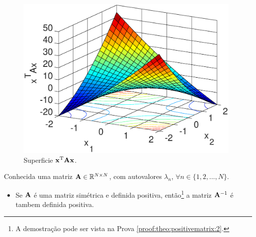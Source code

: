 \begin{minipage}{0.5\textwidth}
     \begin{figure}[H]
         \centering
         \includegraphics[width=0.98\textwidth]{chapters/teoria-basica/mfiles/positive-matrix/surfcexAx.eps}
         \caption{Superficie $\VECTOR{x}^{\transpose}\MATRIX{A}\VECTOR{x}$. }
         \label{fig:ex:positivematrix1}
     \end{figure}
\end{minipage}

\begin{theorem}\label{theo:positivematrix:2}
Conhecida uma matriz  $\MATRIX{A} \in \mathbb{R}^{N \times N}$, com  autovalores $\lambda_n$,
$\forall n \in \{1, 2, ..., N\}$.
\begin{itemize}
\item Se $\MATRIX{A}$ é uma matriz simétrica e definida positiva, então\footnote{A
demostração pode ser vista na Prova \ref{proof:theo:positivematrix:2}.}  
a matriz $\MATRIX{A}^{-1}$ é tambem definida positiva.
\end{itemize}
\end{theorem}

